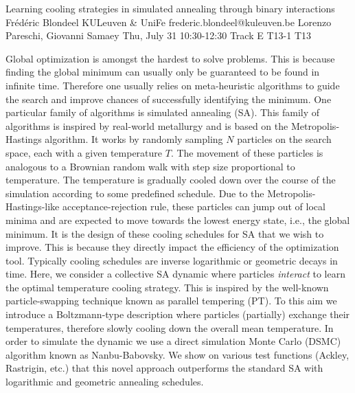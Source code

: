 \begin{talk}
  {Learning cooling strategies in simulated annealing through binary interactions}%
  {Frédéric Blondeel}%
  {KULeuven \& UniFe}%
  {frederic.blondeel@kuleuven.be}%
  {Lorenzo Pareschi, Giovanni Samaey}%
  {}%
  {Thu, July 31 10:30-12:30 Track E}%
  {T13-1}%
  {T13}%
  
				
			
Global optimization is amongst the hardest to solve problems. This is because finding the global minimum can usually only be guaranteed to be found in infinite time. Therefore one usually relies on meta-heuristic algorithms to guide the search and improve chances of successfully identifying the minimum. One particular family of algorithms is simulated annealing (SA). This family of algorithms is inspired by real-world metallurgy and is based on the Metropolis-Hastings algorithm. It works by randomly sampling $N$ particles on the search space, each with a given temperature $T$. The movement of these particles is analogous to a Brownian random walk with step size proportional to temperature. The temperature is gradually cooled down over the course of the simulation according to some predefined schedule. Due to the Metropolis-Hastings-like acceptance-rejection rule, these particles can jump out of local minima and are expected to move towards the lowest energy state, i.e., the global minimum. It is the design of these cooling schedules for SA that we wish to improve. This is because they directly impact the efficiency of the optimization tool. Typically cooling schedules are inverse logarithmic or geometric decays in time. Here, we consider a collective SA dynamic where particles \textit{interact} to learn the optimal temperature cooling strategy. This is inspired by the well-known particle-swapping technique known as parallel tempering (PT). To this aim we introduce a Boltzmann-type description where particles (partially) exchange their temperatures, therefore slowly cooling down the overall mean temperature. In order to simulate the dynamic we use a direct simulation Monte Carlo (DSMC) algorithm known as Nanbu-Babovsky. We show on various test functions (Ackley, Rastrigin, etc.) that this novel approach outperforms the standard SA with logarithmic and geometric annealing schedules.

\end{talk}

